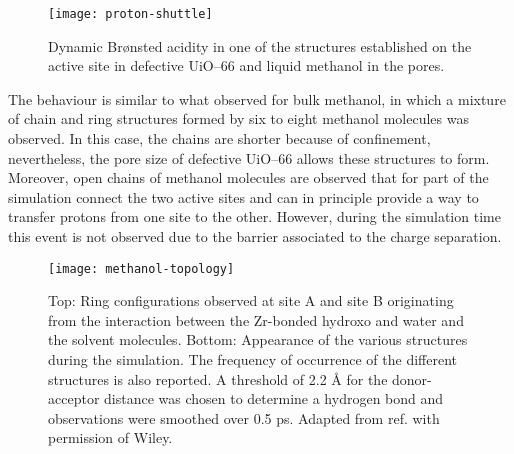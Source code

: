 \begin{figure}[!htbp]
	\centering
	\texttt{[image: proton-shuttle]}
	\caption{Dynamic Br\o{}nsted acidity in one of the structures established on the active site in defective UiO--66 and liquid methanol in the pores.}
	\label{fig:proton-shuttle}
\end{figure}
\npar
The behaviour is similar to what observed for bulk methanol\cite{kashtanov2005chemical, pagliai2003hydrogen, morrone2002ab}, in which a mixture of chain and ring structures formed by six to eight methanol molecules was observed. In this case, the chains are shorter because of confinement, nevertheless, the pore size of defective UiO--66 allows these structures to form. Moreover, open chains of methanol molecules are observed that for part of the simulation connect the two active sites and can in principle provide a way to transfer protons from one site to the other. However, during the simulation time this event is not observed due to the barrier associated to the charge separation. 
\begin{figure}[!htbp]
	\centering
	\texttt{[image: methanol-topology]}
	\caption{Top: Ring configurations observed at site A and site B originating from the interaction between the Zr-bonded hydroxo and water and the solvent molecules. Bottom: Appearance of the various structures during the simulation. The frequency of occurrence of the different structures is also reported. A threshold of 2.2 Å for the donor-acceptor distance was chosen to determine a hydrogen bond and observations were smoothed over 0.5 ps.  Adapted from ref. \cite{caratelli2018influence} with permission of Wiley.}
	\label{fig:methanol-topology}
\end{figure}
\npar
